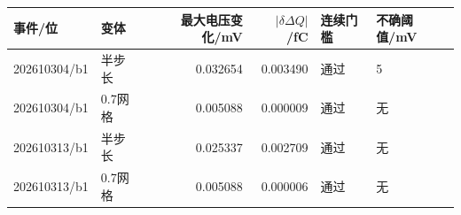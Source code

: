 \begin{tabular}{llrrll}
\toprule
事件/位 & 变体 & 最大电压变化/mV & $|\delta\Delta Q|$/fC & 连续门槛 & 不确阈值/mV\\
\midrule
202610304/b1 & 半步长 & 0.032654 & 0.003490 & 通过 & 5\\
202610304/b1 & 0.7网格 & 0.005088 & 0.000009 & 通过 & 无\\
202610313/b1 & 半步长 & 0.025337 & 0.002709 & 通过 & 无\\
202610313/b1 & 0.7网格 & 0.005088 & 0.000006 & 通过 & 无\\
\bottomrule
\end{tabular}
